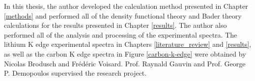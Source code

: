 In this thesis, the author developed the calculation method presented in Chapter \ref{methods} and performed all of the density functional theory and Bader theory calculations for the results presented in Chapter \ref{results}.  The author also performed all of the analysis and processing of the experimental spectra.  The lithium K edge experimental spectra in Chapters \ref{literature_review} and \ref{results}, as well as the carbon K edge spectra in Figure \ref{carbon-k-edge} were obtained by Nicolas Brodusch and Fr\'ed\'eric Voisard.  Prof. Raynald Gauvin and Prof. George P. Demopoulos supervised the research project.  